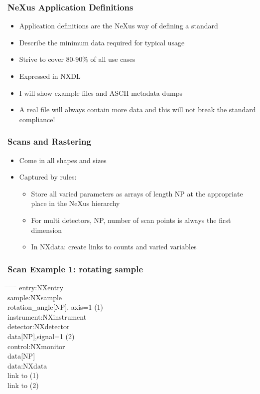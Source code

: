 \documentclass{beamer}
\begin{document}
\begin{frame}
\frametitle{NeXus Application Definitions}
\begin{itemize}
\item<1->Application definitions are the NeXus way of defining a standard
\item<2->Describe the minimum data required for typical usage 
\item<3->Strive to cover 80-90\% of all use cases
\item<4->Expressed in NXDL
\item<5->I will show example files and ASCII metadata dumps
\item<6->{\color{blue}A real file will always contain more data and this will not break the standard compliance!} 
\end{itemize}
\end{frame}


\begin{frame}
\frametitle{Scans and Rastering}
\begin{itemize}
\item Come in all shapes and sizes
\item Captured by rules:
\begin{itemize}
\item Store all varied parameters as arrays of length NP at the appropriate place in the NeXus 
 hierarchy
\item For multi detectors, NP, number of scan points is always the first dimension
\item In NXdata: create links to counts and varied variables
\end{itemize}
\end{itemize}
\end{frame}


\begin{frame}
\frametitle{Scan Example 1: rotating sample}

\begin{tabbing}
\hspace*{1cm} \= \hspace*{1cm} \= \hspace*{1cm} \= \hspace*{1cm} \= \hspace*{1cm} \= \hspace*{1cm}\= \kill
entry:NXentry \\
 \>sample:NXsample\\
 \> \> rotation\_angle[NP], axis=1 (1) \\
 \> instrument:NXinstrument\\
 \>  \>detector:NXdetector\\
 \>  \> \>data[NP],signal=1 (2)\\
 \>control:NXmonitor\\  
 \> \>data[NP]\\  
 \>data:NXdata\\
 \> \> link to (1)\\
 \> \> link to (2) \\
\end{tabbing}
\end{frame}
\end{document}
